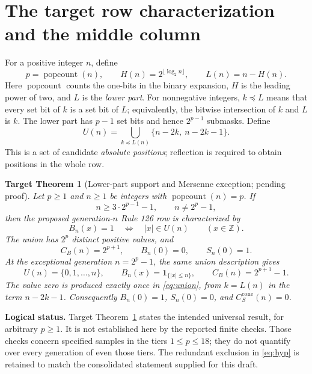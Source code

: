 \documentclass[11pt]{article}
\newtheorem{targettheorem}{Target Theorem}
\newcommand{\pc}{\operatorname{popcount}}
\newcommand{\sub}{\preceq}
\newcommand{\ind}{\mathbf{1}}
\newcommand{\Z}{\mathbb{Z}}
\begin{document}
\section{The target row characterization and the middle column}
\label{sec:target}

For a positive integer $n$, define
\[
 p=\pc(n),\qquad H(n)=2^{\lfloor\log_2 n\rfloor},\qquad L(n)=n-H(n).
\]
Here $\pc$ counts the one-bits in the binary expansion, $H$ is the leading
power of two, and $L$ is the \emph{lower part}. For nonnegative integers,
$k\sub L$ means that every set bit of $k$ is a set bit of $L$; equivalently,
the bitwise intersection of $k$ and $L$ is $k$. The lower part has $p-1$
set bits and hence $2^{p-1}$ submasks. Define
\begin{equation}
 U(n)=\bigcup_{k\sub L(n)}\{n-2k,\ n-2k-1\}.
 \label{eq:union}
\end{equation}
This is a set of candidate \emph{absolute positions}; reflection is required
to obtain positions in the whole row.

\begin{targettheorem}[Lower-part support and Mersenne exception;
pending proof]\label{thm:target}
Let $p\geq1$ and $n\geq1$ be integers with $\pc(n)=p$. If
\begin{equation}
 n\geq3\cdot2^{p-1}-1,\qquad n\ne2^p-1,
 \label{eq:hyp}
\end{equation}
then the proposed generation-$n$ Rule 126 row is characterized by
\begin{equation}
 B_n(x)=1\quad\Longleftrightarrow\quad |x|\in U(n)
 \qquad(x\in\Z).
 \label{eq:support}
\end{equation}
The union has $2^p$ distinct positive values, and
\begin{equation}
 C_B(n)=2^{p+1},\qquad B_n(0)=0,\qquad S_n(0)=1.
 \label{eq:ordinarycount}
\end{equation}
At the exceptional generation $n=2^p-1$, the same union description gives
\begin{equation}
 U(n)=\{0,1,\ldots,n\},\qquad
 B_n(x)=\ind_{\{|x|\leq n\}},\qquad C_B(n)=2^{p+1}-1.
 \label{eq:mersenne}
\end{equation}
The value zero is produced exactly once in \eqref{eq:union}, from
$k=L(n)$ in the term $n-2k-1$. Consequently $B_n(0)=1$, $S_n(0)=0$,
and $C_S^{\mathrm{cone}}(n)=0$.
\end{targettheorem}

\noindent\textbf{Logical status.}
Target Theorem~\ref{thm:target} states the intended universal result, for
arbitrary $p\geq1$. It is not established here by the reported finite
checks. Those checks concern specified samples in the tiers $1\leq p\leq18$;
they do not quantify over every generation of even those tiers. The
redundant exclusion in \eqref{eq:hyp} is retained to match the consolidated
statement supplied for this draft.
\end{document}
